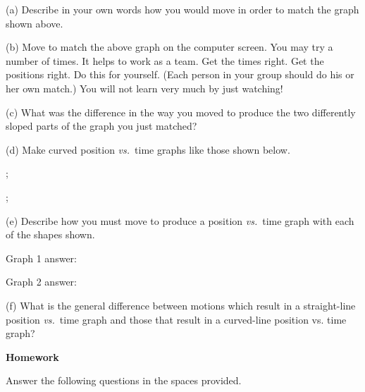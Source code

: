 (a) Describe in your own words how you would move in order to match the graph
shown above.
\answerspace{15mm}

(b) Move to match the above graph on the computer screen. You may try a number
of times. It helps to work as a team. Get the times right. Get the positions
right. Do this for yourself. (Each person in your group should do his or her
own match.) You will not learn very much by just watching!

(c) What was the difference in the way you moved to produce the two differently
sloped parts of the graph you just matched?
\answerspace{12mm}

(d) Make curved position \textit{vs.}~time graphs like those shown below.

\begin{center}
\begin{lab_axis}[lab_noticks_1quad,
	height = {1.0in}, width = {1.5in},
	xlabel={Time},
	ylabel={Position},
	title={Graph 1},
	]
;
\end{lab_axis}
\hspace{0.5in}
\begin{lab_axis}[lab_noticks_1quad,
	height = {1.0in}, width = {1.5in},
	xlabel={Time},
	ylabel={Position},
	title={Graph 2},
	]
;
\end{lab_axis}
\end{center}


(e) Describe how you must move to produce a position \textit{vs.}~time graph with each
of the shapes shown.

Graph 1 answer:
\answerspace{10mm}

Graph 2 answer:
\answerspace{10mm}

\pagebreak[3]
(f) What is the general difference between motions which result in a straight-line
position \textit{vs.}~time graph and those that result in a curved-line position vs.
time graph?
\answerspace{15mm}

\textbf{Homework} 

Answer the following questions in the spaces provided.

